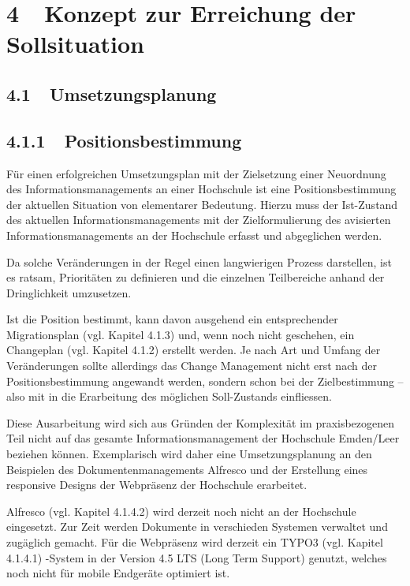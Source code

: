 \documentclass{article}
\title{}
\begin{document}
\section[4\ \ Konzept zur Erreichung der Sollsituation]{4\ \ Konzept zur Erreichung der Sollsituation}
\subsection[4.1\ \ Umsetzungsplanung]{4.1\ \ Umsetzungsplanung}
\subsection[4.1.1\ \ Positionsbestimmung]{4.1.1\ \ Positionsbestimmung}
Für einen erfolgreichen Umsetzungsplan mit der Zielsetzung einer Neuordnung des Informationsmanagements an einer
Hochschule ist eine Positionsbestimmung der aktuellen Situation von elementarer Bedeutung. Hierzu muss der Ist-Zustand
des aktuellen Informationsmanagements mit der Zielformulierung des avisierten Informationsmanagements an der Hochschule
erfasst und abgeglichen werden. 


\bigskip

Da solche Veränderungen in der Regel einen langwierigen Prozess darstellen, ist es ratsam, Prioritäten zu definieren und
die einzelnen Teilbereiche anhand der Dringlichkeit umzusetzen. 


\bigskip

Ist die Position bestimmt, kann davon ausgehend ein entsprechender Migrationsplan (vgl. Kapitel 4.1.3) und, wenn noch
nicht geschehen, ein Changeplan (vgl. Kapitel 4.1.2) erstellt werden. Je nach Art und Umfang der Veränderungen sollte
allerdings das Change Management nicht erst nach der Positionsbestimmung angewandt werden, sondern schon bei der
Zielbestimmung – also mit in die Erarbeitung des möglichen Soll-Zustands einfliessen. 


\bigskip

Diese Ausarbeitung wird sich aus Gründen der Komplexität im praxisbezogenen Teil nicht auf das gesamte
Informationsmanagement der Hochschule Emden/Leer beziehen können. Exemplarisch wird daher eine Umsetzungsplanung an den
Beispielen des Dokumentenmanagements Alfresco und der Erstellung eines responsive Designs der Webpräsenz der Hochschule
erarbeitet.


\bigskip


\bigskip

Alfresco (vgl. Kapitel 4.1.4.2) wird derzeit noch nicht an der Hochschule eingesetzt. Zur Zeit werden Dokumente in
verschieden Systemen verwaltet und zugäglich gemacht. Für die Webpräsenz wird derzeit ein TYPO3 (vgl. Kapitel 4.1.4.1)
-System in der Version 4.5 LTS (Long Term Support) genutzt, welches noch nicht für mobile Endgeräte optimiert ist. 
\end{document}

